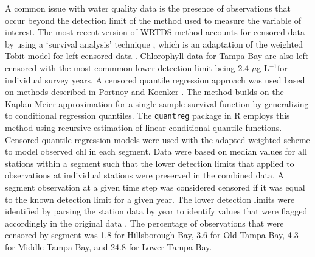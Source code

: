 \documentclass{svjour3}\usepackage[]{graphicx}\usepackage[]{color}
\newcommand{\mugl}{$\mu$g L$^{-1}$}
\begin{document}
A common issue with water quality data is the presence of observations that occur beyond the detection limit of the method used to measure the variable of interest.  The most recent version of \ac{WRTDS} method accounts for censored data by using a `survival analysis' technique \cite{Moyer12,Hirsch14}, which is an adaptation of the weighted Tobit model for left-censored data \cite{Tobin58}.  Chlorophyll data for Tampa Bay are also left censored with the most commmon lower detection limit being 2.4 \mugl for individual survey years.  A censored quantile regression approach was used based on methods described in Portnoy \cite{Portnoy03} and Koenker \cite{Koenker08}.  The method builds on the Kaplan-Meier approximation for a single-sample survival function by generalizing to conditional regression quantiles.  The \texttt{quantreg} package in R \cite{Koenker13} employs this method using recursive estimation of linear conditional quantile functions.  Censored quantile regression models were used with the adapted weighted scheme to model observed \ac{chl} in each segment.  Data were based on median values for all stations within a segment such that the lower detection limits that applied to observations at individual stations were preserved in the combined data.  A segment observation at a given time step was considered censored if it was equal to the known detection limit for a given year.  The lower detection limits were identified by parsing the station data by year to identify values that were flagged accordingly in the original data \cite{TBEP11}.  The percentage of observations that were censored by segment was 1.8 for Hillsborough Bay, 3.6 for Old Tampa Bay, 4.3 for Middle Tampa Bay, and 24.8 for Lower Tampa Bay.
\end{document}
